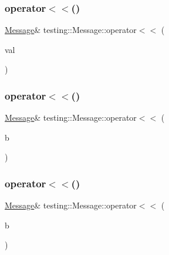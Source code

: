\mbox{\label{classtesting_1_1_message_a3a71a1c1c8ea52de5852d75483d41453}} 
\subsubsection{\texorpdfstring{operator$<$$<$()}{operator<<()}\hspace{0.1cm}{\footnotesize\ttfamily [8/18]}}
{\footnotesize\ttfamily \mbox{\hyperlink{classtesting_1_1_message}{Message}}\& testing\+::\+Message\+::operator$<$$<$ (\begin{DoxyParamCaption}\item[{\mbox{\hyperlink{classtesting_1_1_message_ad398b70e2a11b923cef05c809b0eeb92}{Basic\+Narrow\+Io\+Manip}}}]{val }\end{DoxyParamCaption})\hspace{0.3cm}{\ttfamily [inline]}}

\mbox{\label{classtesting_1_1_message_a3e1e04f23b1bdfe18adfd59928296346}} 
\subsubsection{\texorpdfstring{operator$<$$<$()}{operator<<()}\hspace{0.1cm}{\footnotesize\ttfamily [9/18]}}
{\footnotesize\ttfamily \mbox{\hyperlink{classtesting_1_1_message}{Message}}\& testing\+::\+Message\+::operator$<$$<$ (\begin{DoxyParamCaption}\item[{bool}]{b }\end{DoxyParamCaption})\hspace{0.3cm}{\ttfamily [inline]}}

\mbox{\label{classtesting_1_1_message_a3e1e04f23b1bdfe18adfd59928296346}} 
\subsubsection{\texorpdfstring{operator$<$$<$()}{operator<<()}\hspace{0.1cm}{\footnotesize\ttfamily [10/18]}}
{\footnotesize\ttfamily \mbox{\hyperlink{classtesting_1_1_message}{Message}}\& testing\+::\+Message\+::operator$<$$<$ (\begin{DoxyParamCaption}\item[{bool}]{b }\end{DoxyParamCaption})\hspace{0.3cm}{\ttfamily [inline]}}


